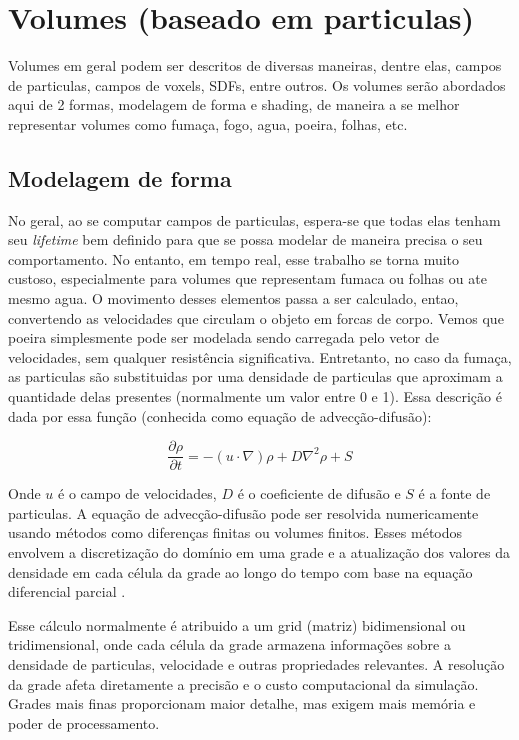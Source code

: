 \section{Volumes (baseado em particulas)}
\label{sec:volumes}

Volumes em geral podem ser descritos de diversas maneiras, dentre elas, campos de particulas, campos de voxels, SDFs, entre outros. Os volumes serão abordados aqui de 2 formas, modelagem de forma e shading, de maneira a se melhor representar volumes como fumaça, fogo, agua, poeira, folhas, etc.

\subsection{Modelagem de forma}
No geral, ao se computar campos de particulas, espera-se que todas elas tenham seu \textit{lifetime} bem definido para que se possa modelar de maneira precisa o seu comportamento. No entanto, em tempo real, esse trabalho se torna muito custoso, especialmente para volumes que representam fumaca ou folhas ou ate mesmo agua. O movimento desses elementos passa a ser calculado, entao, convertendo as velocidades que circulam o objeto em forcas de corpo. Vemos que poeira simplesmente pode ser modelada sendo carregada pelo vetor de velocidades, sem qualquer resistência significativa. Entretanto, no caso da fumaça, as particulas são substituidas por uma densidade de particulas que aproximam a quantidade delas presentes (normalmente um valor entre 0 e 1). Essa descrição é dada por essa função (conhecida como equação de advecção-difusão): 

$$
\frac{\partial \rho}{\partial t} = - (u \cdot \nabla) \rho + D \nabla^2 \rho + S
$$

Onde $u$ é o campo de velocidades, $D$ é o coeficiente de difusão e $S$ é a fonte de particulas. A equação de advecção-difusão pode ser resolvida numericamente usando métodos como diferenças finitas ou volumes finitos. Esses métodos envolvem a discretização do domínio em uma grade e a atualização dos valores da densidade em cada célula da grade ao longo do tempo com base na equação diferencial parcial \cite{Stam2003}.

Esse cálculo normalmente é atribuido a um grid (matriz) bidimensional ou tridimensional, onde cada célula da grade armazena informações sobre a densidade de particulas, velocidade e outras propriedades relevantes. A resolução da grade afeta diretamente a precisão e o custo computacional da simulação. Grades mais finas proporcionam maior detalhe, mas exigem mais memória e poder de processamento.

